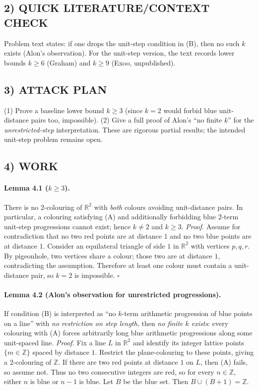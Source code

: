 \subsection*{2) QUICK LITERATURE/CONTEXT CHECK}
Problem text states: if one drops the unit-step condition in (B), then no such $k$ exists (Alon’s observation).
For the unit-step version, the text records lower bounds $k\ge 6$ (Graham) and $k\ge 9$ (Exoo, unpublished).

\subsection*{3) ATTACK PLAN}
(1) Prove a baseline lower bound $k\ge 3$ (since $k=2$ would forbid blue unit-distance pairs too, impossible).
(2) Give a full proof of Alon’s ``no finite $k$'' for the \emph{unrestricted-step} interpretation.
These are rigorous partial results; the intended unit-step problem remains open.

\subsection*{4) WORK}

\paragraph{Lemma 4.1 ($k\ge 3$).}
There is no 2-colouring of $\mathbb{R}^2$ with \emph{both} colours avoiding unit-distance pairs.
In particular, a colouring satisfying (A) and additionally forbidding blue 2-term unit-step progressions cannot exist; hence $k\ne 2$ and $k\ge 3$.
\textit{Proof.}
Assume for contradiction that no two red points are at distance $1$ and no two blue points are at distance $1$.
Consider an equilateral triangle of side $1$ in $\mathbb{R}^2$ with vertices $p,q,r$.
By pigeonhole, two vertices share a colour; those two are at distance $1$, contradicting the assumption.
Therefore at least one colour must contain a unit-distance pair, so $k=2$ is impossible. \hfill$\square$

\paragraph{Lemma 4.2 (Alon’s observation for unrestricted progressions).}
If condition (B) is interpreted as ``no $k$-term arithmetic progression of blue points on a line'' with \emph{no restriction on step length},
then \emph{no finite $k$ exists}: every colouring with (A) forces arbitrarily long blue arithmetic progressions along some unit-spaced line.
\textit{Proof.}
Fix a line $L$ in $\mathbb{R}^2$ and identify its integer lattice points $\{m\in\mathbb{Z}\}$ spaced by distance $1$.
Restrict the plane-colouring to these points, giving a 2-colouring of $\mathbb{Z}$.
If there are two red points at distance $1$ on $L$, then (A) fails, so assume not.
Thus no two consecutive integers are red, so for every $n\in\mathbb{Z}$, either $n$ is blue or $n-1$ is blue.
Let $B$ be the blue set. Then $B\cup (B+1)=\mathbb{Z}$.

